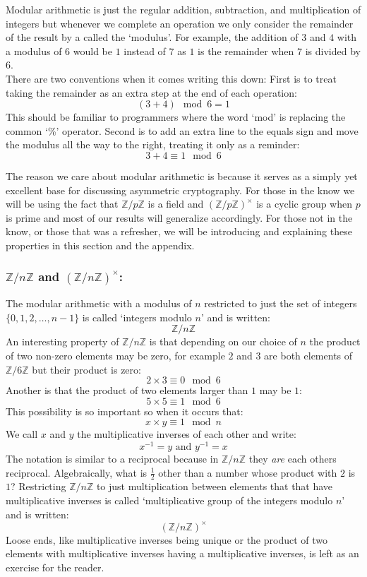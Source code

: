 
Modular arithmetic is just the regular addition, subtraction, and multiplication of integers but whenever we complete an operation we only consider the remainder of the result by a called the `modulus'.
For example,
the addition of $3$ and $4$ with a modulus of $6$ would be $1$ instead of $7$ as $1$ is the remainder when $7$ is divided by $6$.
\\

There are two conventions when it comes writing this down:
First is to treat taking the remainder as an extra step at the end of each operation:  
\[(3+4)\mod 6 = 1\]
This should be familiar to programmers where the word `mod' is replacing the common `\%' operator.
Second is to add an extra line to the equals sign and move the modulus all the way to the right, 
treating it only as a reminder:
\[3+4\equiv 1 \mod 6\]

The reason we care about modular arithmetic is because it serves as a simply yet excellent base for discussing asymmetric cryptography.
For those in the know we will be using the fact that $\mathbb{Z}/p\mathbb{Z}$ is a field and $(\mathbb{Z}/p\mathbb{Z})^\times$ is a cyclic group when $p$ is prime and most of our results will generalize accordingly.
For those not in the know,
or those that was a refresher,
we will be introducing and explaining these properties in this section and the appendix.

\subsubsection{$\mathbb{Z}/n\mathbb{Z}$ and $(\mathbb{Z}/n\mathbb{Z})^\times$:}
The modular arithmetic with a modulus of $n$ restricted to just the set of integers $\{0,1,2,\dots,n-1\}$ is called `integers modulo $n$' and is written:
\[\mathbb{Z}/n\mathbb{Z}\]
An interesting property of $\mathbb{Z}/n\mathbb{Z}$ is that depending on our choice of $n$ the product of two non-zero elements may be zero,
for example $2$ and $3$ are both elements of $\mathbb{Z}/6\mathbb{Z}$ but their product is zero:
\[ 2\times 3 \equiv 0 \mod 6\]
Another is that the product of two elements larger than $1$ may be $1$:
\[ 5\times 5 \equiv 1 \mod 6\]
This possibility is so important so when it occurs that:
\[x\times y\equiv 1 \mod n\]
We call $x$ and $y$ the multiplicative inverses of each other and write:
\[x^{-1} = y \text{  and  } y^{-1}=x\]
The notation is similar to a reciprocal because in $\mathbb{Z}/n\mathbb{Z}$ they \textit{are} each others reciprocal.
Algebraically, 
what is $\frac{1}{2}$ other than a number whose product with $2$ is $1$?
Restricting $\mathbb{Z}/n\mathbb{Z}$ to just multiplication between elements that that have multiplicative inverses is called `multiplicative group of the integers modulo $n$' and is written:
\[(\mathbb{Z}/n\mathbb{Z})^\times\]
Loose ends, 
like multiplicative inverses being unique or the product of two elements with multiplicative inverses having a multiplicative inverses,
is left as an exercise for the reader.

